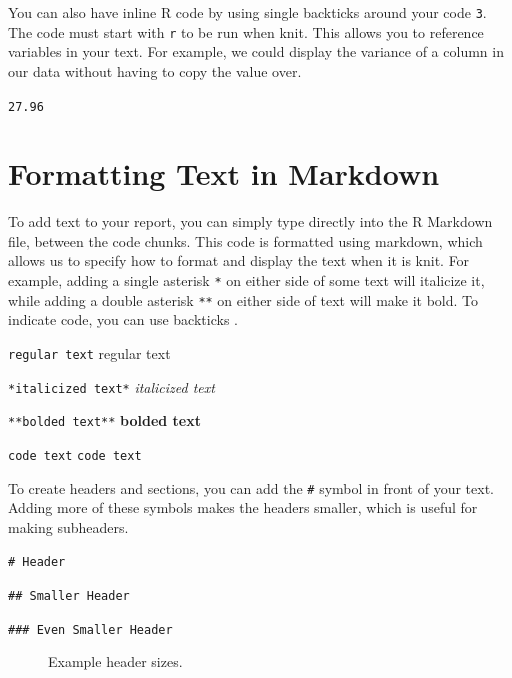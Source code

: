 \documentclass[
  letterpaper,
]{krantz}
\begin{document}
You can also have inline R code by using single backticks around your
code \texttt{3}. The code must start with \texttt{r} to be run when
knit. This allows you to reference variables in your text. For example,
we could display the variance of a column in our data without having to
copy the value over.

\texttt{27.96}

\section{Formatting Text in Markdown}\label{formatting-text-in-markdown}

To add text to your report, you can simply type directly into the R
Markdown file, between the code chunks. This code is formatted using
markdown, which allows us to specify how to format and display the text
when it is knit. For example, adding a single asterisk \texttt{*} on
either side of some text will italicize it, while adding a double
asterisk \texttt{**} on either side of text will make it bold. To
indicate code, you can use backticks \texttt{\textasciigrave{}}.

\texttt{regular\ text} regular text

\texttt{*italicized\ text*} \emph{italicized text}

\texttt{**bolded\ text**} \textbf{bolded text}

\texttt{\textasciigrave{}code\ text\textasciigrave{}}
\texttt{code\ text}

To create headers and sections, you can add the \texttt{\#} symbol in
front of your text. Adding more of these symbols makes the headers
smaller, which is useful for making subheaders.

\texttt{\#\ Header}

\texttt{\#\#\ Smaller\ Header}

\texttt{\#\#\#\ Even\ Smaller\ Header}

\begin{figure}


\caption{\label{fig-headers}Example header sizes.}

\end{figure}%
\end{document}
